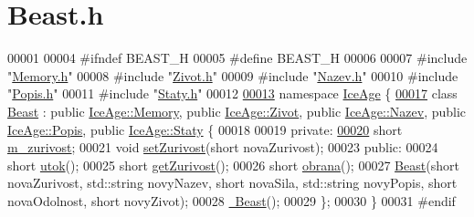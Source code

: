 \hypertarget{Beast_8h_source}{}\section{Beast.\+h}
\label{Beast_8h_source}

\begin{DoxyCode}
00001 
00004 \textcolor{preprocessor}{#ifndef BEAST\_H}
00005 \textcolor{preprocessor}{#define BEAST\_H}
00006 
00007 \textcolor{preprocessor}{#include "\hyperlink{Memory_8h}{Memory.h}"}
00008 \textcolor{preprocessor}{#include "\hyperlink{Zivot_8h}{Zivot.h}"}
00009 \textcolor{preprocessor}{#include "\hyperlink{Nazev_8h}{Nazev.h}"}
00010 \textcolor{preprocessor}{#include "\hyperlink{Popis_8h}{Popis.h}"}
00011 \textcolor{preprocessor}{#include "\hyperlink{Staty_8h}{Staty.h}"}
00012 
\hypertarget{Beast_8h_source.tex_l00013}{}\hyperlink{namespaceIceAge}{00013} \textcolor{keyword}{namespace }\hyperlink{namespaceIceAge}{IceAge} \{
\hypertarget{Beast_8h_source.tex_l00017}{}\hyperlink{classIceAge_1_1Beast}{00017}     \textcolor{keyword}{class }\hyperlink{classIceAge_1_1Beast}{Beast} : \textcolor{keyword}{public} \hyperlink{classIceAge_1_1Memory}{IceAge::Memory}, \textcolor{keyword}{public} \hyperlink{classIceAge_1_1Zivot}{IceAge::Zivot}, \textcolor{keyword}{public} 
      \hyperlink{classIceAge_1_1Nazev}{IceAge::Nazev}, \textcolor{keyword}{public} \hyperlink{classIceAge_1_1Popis}{IceAge::Popis}, \textcolor{keyword}{public} 
      \hyperlink{classIceAge_1_1Staty}{IceAge::Staty} \{
00018 
00019     \textcolor{keyword}{private}:
\hypertarget{Beast_8h_source.tex_l00020}{}\hyperlink{classIceAge_1_1Beast_a4ab89bf8c404db2afa13f83dd893098b}{00020}         \textcolor{keywordtype}{short} \hyperlink{classIceAge_1_1Beast_a4ab89bf8c404db2afa13f83dd893098b}{m\_zurivost};
00021         \textcolor{keywordtype}{void} \hyperlink{classIceAge_1_1Beast_a3be2043a37d885dc4a9ecb0e12674f15}{setZurivost}(\textcolor{keywordtype}{short} novaZurivost);
00023     \textcolor{keyword}{public}:
00024         \textcolor{keywordtype}{short} \hyperlink{classIceAge_1_1Beast_aa51303b6d8ff02435b44f566f49c7443}{utok}();
00025         \textcolor{keywordtype}{short} \hyperlink{classIceAge_1_1Beast_a5c79a63fbc0a1bb4bcbb9a8dc3f53a6e}{getZurivost}();
00026         \textcolor{keywordtype}{short} \hyperlink{classIceAge_1_1Beast_a5968dfee492be5e23cf241306d3dea75}{obrana}();
00027         \hyperlink{classIceAge_1_1Beast_ac5cd6bdf15572c9844562995758f0c01}{Beast}(\textcolor{keywordtype}{short} novaZurivost, std::string novyNazev, \textcolor{keywordtype}{short} novaSila, std::string novyPopis, \textcolor{keywordtype}{short} 
      novaOdolnost, \textcolor{keywordtype}{short} novyZivot);
00028         \hyperlink{classIceAge_1_1Beast_a8bf5311c895c575026e812e4b30b6f07}{~Beast}();
00029     \};
00030 \}
00031 \textcolor{preprocessor}{#endif}
\end{DoxyCode}
